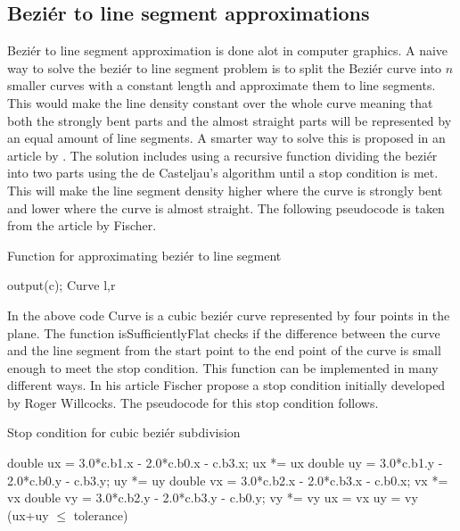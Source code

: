 \subsection{Beziér to line segment approximations}
Beziér to line segment approximation is done alot in computer graphics. A naive way to solve the beziér to line segment problem is to split the Beziér curve into $n$ smaller curves with a constant length and approximate them to line segments. This would make the line density constant over the whole curve meaning that both the strongly bent parts and the almost straight parts will be represented by an equal amount of line segments. A smarter way to solve this is proposed in an article by \citet{fischer2000}. The solution includes using a recursive function dividing the beziér into two parts using the de Casteljau's algorithm until a stop condition is met. This will make the line segment density higher where the curve is strongly bent and lower where the curve is almost straight. The following pseudocode is taken from the article by Fischer.
\begin{algorithm}[H]
\caption{Function for approximating beziér to line segment}
\begin{algorithmic}
  \State output(c);
\Else
	\State Curve l,r\;
	\State{}\;
	\State{}\;
	\State{}\;
\EndIf
\EndProcedure
\end{algorithmic}
\end{algorithm}
In the above code Curve is a cubic beziér curve represented by four points in the plane. The function isSufficientlyFlat checks if the difference between the curve and the line segment from the start point to the end point of the curve is small enough to meet the stop condition. This function can be implemented in many different ways. In his article Fischer propose a stop condition initially developed by Roger Willcocks. The pseudocode for this stop condition follows.

\begin{algorithm}[H]
\caption{Stop condition for cubic beziér subdivision}
\begin{algorithmic}
	\State double ux = 3.0*c.b1.x - 2.0*c.b0.x - c.b3.x; ux *= ux\;
	\State double uy = 3.0*c.b1.y - 2.0*c.b0.y - c.b3.y; uy *= uy\;
	\State double vx = 3.0*c.b2.x - 2.0*c.b3.x - c.b0.x; vx *= vx\;
	\State double vy = 3.0*c.b2.y - 2.0*c.b3.y - c.b0.y; vy *= vy\;
	\State ux = vx\; 	
	\EndIf
		\State uy = vy\; 
	\EndIf
	\State\Return (ux+uy $\leq$ tolerance)\;
\EndFunction
\end{algorithmic}
\end{algorithm}

